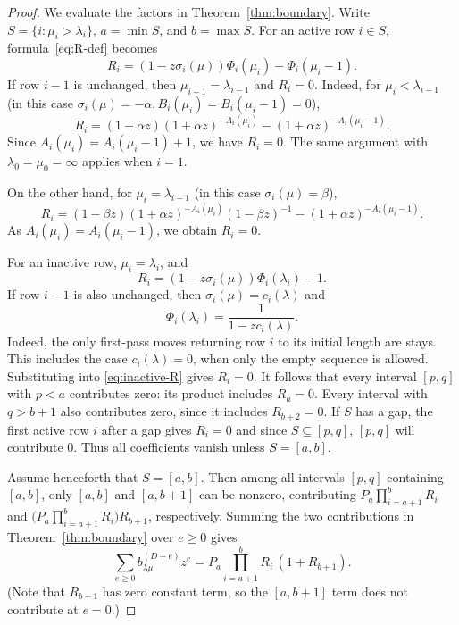 \documentclass[11pt]{amsart}
\numberwithin{equation}{section}
\theoremstyle{definition}
\theoremstyle{remark}
\begin{document}
\begin{proof}
We evaluate the factors in Theorem~\ref{thm:boundary}. Write
$S=\{i:\mu_i>\lambda_i\}$, $a=\min S$, and $b=\max S$.
For an active row $i\in S$, formula~\eqref{eq:R-def} becomes
\begin{equation}\label{eq:active-R}
 R_i=(1-z\sigma_i(\mu))\Phi_i(\mu_i)-\Phi_i(\mu_i-1).
\end{equation}
If row $i-1$ is unchanged, then $\mu_{i-1}=\lambda_{i-1}$ and 
$R_i=0$. Indeed, for $\mu_i<\lambda_{i-1}$ (in this case $\sigma_i(\mu)=-\alpha , B_i(\mu_i)=B_i(\mu_i-1)=0$),
$$R_i=(1+\alpha z)(1+ \alpha z)^{-A_i(\mu_i)}- (1+ \alpha z)^{-A_i(\mu_i-1)}.$$
Since $A_i(\mu_i)=A_i(\mu_i-1) +1 $, we have $R_i=0$. The same argument with
$\lambda_0=\mu_0=\infty$ applies when $i=1$.


On the other hand, for
$\mu_i=\lambda_{i-1}$ (in this case $\sigma_i(\mu)=\beta$),
$$ R_i= (1-\beta z)(1+\alpha z)^{-A_i(\mu_i)} (1 - \beta z)^{-1}- (1+\alpha z)^{-A_i(\mu_i-1)}.$$
As $A_i(\mu_i)=A_i(\mu_i-1) $, we obtain $R_i=0$.

For an inactive row, $\mu_i=\lambda_i$, and
\begin{equation}\label{eq:inactive-R}
 R_i=(1-z\sigma_i(\mu))\Phi_i(\lambda_i)-1.
\end{equation}
If row $i-1$ is also unchanged, then
$\sigma_i(\mu)=c_i(\lambda)$ and
\[
 \Phi_i(\lambda_i)=\frac{1}{1-zc_i(\lambda)}.
\]
Indeed, the only first-pass moves returning row $i$ to its
initial length are stays. This includes the case
$c_i(\lambda)=0$, when only the empty sequence is allowed.
Substituting into \eqref{eq:inactive-R} gives $R_i=0$. 
It follows that every interval $[p,q]$ with $p<a$ contributes zero:
its product includes $R_a=0$. Every interval with $q>b+1$ also
contributes zero, since it includes $R_{b+2}=0$. If $S$ has a gap,
the first active row $i$ after a gap gives $R_i=0$ and since $S \subseteq [p,q]$, $[p,q]$ will contribute $0$. Thus all coefficients vanish unless $S=[a,b]$.

Assume henceforth that $S=[a,b]$. Then among all intervals $[p,q]$ containing
$[a,b]$, only $[a,b]$ and $[a,b+1]$ can be nonzero, contributing
$P_a\prod_{i=a+1}^b R_i$ and $\bigl(P_a\prod_{i=a+1}^b R_i\bigr)R_{b+1}$,
respectively. Summing the two contributions in Theorem~\ref{thm:boundary} over
$e\geq0$ gives
\begin{equation}\label{eq:collapsed-intervals}
 \sum_{e\geq0}b^{(D+e)}_{\lambda\mu}z^e
 =P_a\prod_{i=a+1}^b R_i\,(1+R_{b+1}).
\end{equation}
(Note that $R_{b+1}$ has zero constant term, so the $[a,b+1]$ term does not
contribute at $e=0$.)


\end{proof}
\end{document}
